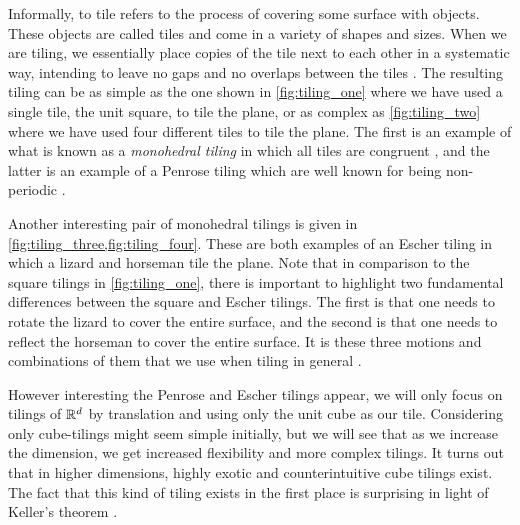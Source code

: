 \documentclass[../thesis.tex]{subfiles}
\begin{document}
Informally, to tile refers to the process of covering some surface with objects. These objects are called tiles and come in a variety of shapes and sizes. When we are tiling, we essentially place copies of the tile next to each other in a systematic way, intending to leave no gaps and no overlaps between the tiles \cite{kolountzakisTilingsTranslation2010}. The resulting tiling can be as simple as the one shown in \cref{fig:tiling_one} where we have used a single tile, the unit square, to tile the plane, or as complex as \cref{fig:tiling_two} where we have used four different tiles to tile the plane. The first is an example of what is known as a \emph{monohedral tiling} in which all tiles are congruent \cite[p. 20]{grunbaumTilingsPatterns1987}, and the latter is an example of a Penrose tiling which are well known for being non-periodic \cite{penrosePentaplexityClassNonPeriodic1979}. %



Another interesting pair of monohedral tilings is given in \cref{fig:tiling_three,fig:tiling_four}. These are both examples of an Escher tiling in which a lizard and horseman tile the plane. Note that in comparison to the square tilings in \cref{fig:tiling_one}, there is important to highlight two fundamental differences between the square and Escher tilings. The first is that one needs to rotate the lizard to cover the entire surface, and the second is that one needs to reflect the horseman to cover the entire surface. It is these three motions and combinations of them that we use when tiling in general \cite[p. 26]{kolountzakisTilingsTranslation2010,grunbaumTilingsPatterns1987}. 



However interesting the Penrose and Escher tilings appear, we will only focus on tilings of $\mathbb{R}^d$ by translation and using only the unit cube as our tile. Considering only cube-tilings might seem simple initially, but we will see that as we increase the dimension, we get increased flexibility and more complex tilings. It turns out that in higher dimensions, highly exotic and counterintuitive cube tilings exist. The fact that this kind of tiling exists in the first place is surprising in light of Keller's theorem \cite{iosevichSpectralTilingProperties1998}.  %
\end{document}
